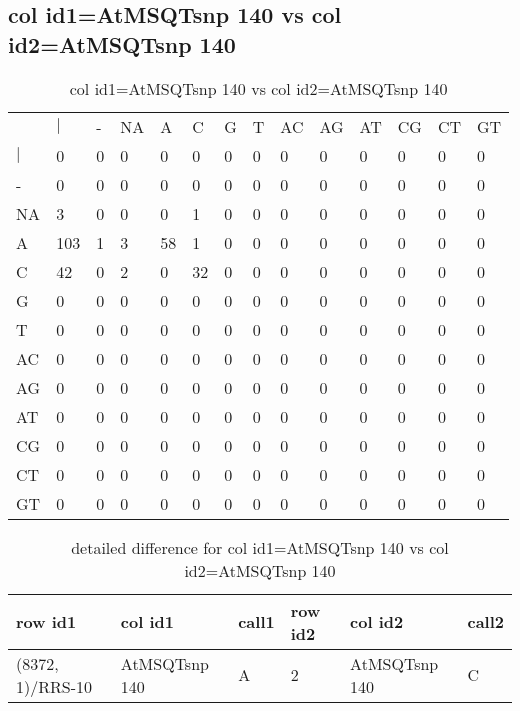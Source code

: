 \subsection{col id1=AtMSQTsnp 140 vs col id2=AtMSQTsnp 140}
\begin{center}
\begin{longtable}{|l|l|l|l|l|l|l|l|l|l|l|l|l|l|}
\caption{col id1=AtMSQTsnp 140 vs col id2=AtMSQTsnp 140} \label{table_dm528}\\
\hline
\\
\hline
&$|$&-&NA&A&C&G&T&AC&AG&AT&CG&CT&GT\\
$|$&0&0&0&0&0&0&0&0&0&0&0&0&0\\
-&0&0&0&0&0&0&0&0&0&0&0&0&0\\
NA&3&0&0&0&1&0&0&0&0&0&0&0&0\\
A&103&1&3&58&1&0&0&0&0&0&0&0&0\\
C&42&0&2&0&32&0&0&0&0&0&0&0&0\\
G&0&0&0&0&0&0&0&0&0&0&0&0&0\\
T&0&0&0&0&0&0&0&0&0&0&0&0&0\\
AC&0&0&0&0&0&0&0&0&0&0&0&0&0\\
AG&0&0&0&0&0&0&0&0&0&0&0&0&0\\
AT&0&0&0&0&0&0&0&0&0&0&0&0&0\\
CG&0&0&0&0&0&0&0&0&0&0&0&0&0\\
CT&0&0&0&0&0&0&0&0&0&0&0&0&0\\
GT&0&0&0&0&0&0&0&0&0&0&0&0&0\\
\hline
\end{longtable}
\end{center}

\begin{center}
\begin{longtable}{|l|l|l|l|l|l|}
\caption{detailed difference for col id1=AtMSQTsnp 140 vs col id2=AtMSQTsnp 140} \label{table_dm529}\\
\hline
row id1&col id1&call1&row id2&col id2&call2\\
\hline
(8372, 1)/RRS-10&AtMSQTsnp 140&A&2&AtMSQTsnp 140&C\\
\hline
\end{longtable}
\end{center}

